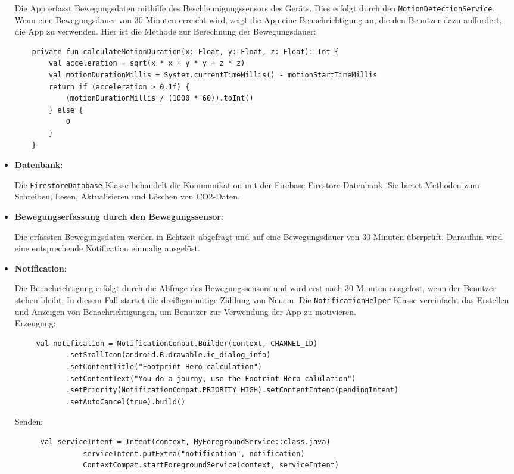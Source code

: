 \documentclass{article}
\begin{document}
\begin{itemize}
    Die App erfasst Bewegungsdaten mithilfe des Beschleunigungssensors des Geräts. Dies erfolgt durch den \texttt{MotionDetectionService}. Wenn eine Bewegungsdauer von 30 Minuten erreicht wird, zeigt die App eine Benachrichtigung an, die den Benutzer dazu auffordert, die App zu verwenden. Hier ist die Methode zur Berechnung der Bewegungsdauer:
    
    \begin{lstlisting}
    private fun calculateMotionDuration(x: Float, y: Float, z: Float): Int {
        val acceleration = sqrt(x * x + y * y + z * z)
        val motionDurationMillis = System.currentTimeMillis() - motionStartTimeMillis
        return if (acceleration > 0.1f) {
            (motionDurationMillis / (1000 * 60)).toInt()
        } else {
            0
        }
    }
    \end{lstlisting}


\item \textbf{Datenbank}:

Die \texttt{FirestoreDatabase}-Klasse behandelt die Kommunikation mit der Firebase Firestore-Datenbank. Sie bietet Methoden zum Schreiben, Lesen, Aktualisieren und Löschen von CO2-Daten.

\item \textbf{Bewegungserfassung durch den Bewegungssensor}:

Die erfassten Bewegungsdaten werden in Echtzeit abgefragt und auf eine Bewegungsdauer von 30 Minuten überprüft. Daraufhin wird eine entsprechende Notification einmalig ausgelöst.

\item \textbf{Notification}:

Die Benachrichtigung erfolgt durch die Abfrage des Bewegungssensors und wird erst nach 30 Minuten ausgelöst, wenn der Benutzer stehen bleibt. In diesem Fall startet die dreißigminütige Zählung von Neuem.  Die \texttt{NotificationHelper}-Klasse vereinfacht das Erstellen und Anzeigen von Benachrichtigungen, um Benutzer zur Verwendung der App zu motivieren.\\
Erzeugung:\\
    \begin{lstlisting}
     val notification = NotificationCompat.Builder(context, CHANNEL_ID)
            .setSmallIcon(android.R.drawable.ic_dialog_info)
            .setContentTitle("Footprint Hero calculation")
            .setContentText("You do a journy, use the Footrint Hero calulation")
            .setPriority(NotificationCompat.PRIORITY_HIGH).setContentIntent(pendingIntent)
            .setAutoCancel(true).build()
     \end{lstlisting}
     Senden:\\
     \begin{lstlisting}
      val serviceIntent = Intent(context, MyForegroundService::class.java)
                serviceIntent.putExtra("notification", notification)
                ContextCompat.startForegroundService(context, serviceIntent)
      \end{lstlisting}


\end{itemize}
\end{document}
